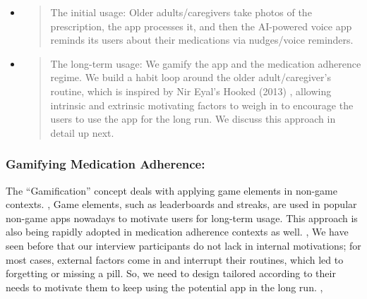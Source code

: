 \documentclass[acmlarge]{acmart}
\begin{document}
\begin{itemize}
\item
  \begin{quote}
  The initial usage: Older adults/caregivers take photos of the
  prescription, the app processes it, and then the AI-powered voice app
  reminds its users about their medications via nudges/voice reminders.
  \end{quote}
\item
  \begin{quote}
  The long-term usage: We gamify the app and the medication adherence
  regime. \cite{10.1145/2181037.2181040} We build a habit loop around the older
  adult/caregiver's routine, which is inspired by Nir Eyal's Hooked
  (2013) \cite{eyal2014hooked}, allowing intrinsic and extrinsic motivating factors
  to weigh in to encourage the users to use the app for the long run. We
  discuss this approach in detail up next.
  \end{quote}
\end{itemize}

\subsubsection{Gamifying Medication
Adherence: }
The ``Gamification'' concept deals with applying game elements in
non-game contexts. \cite{KRATH2021106963}, \cite{10.1145/1979742.1979575}Game elements, such as leaderboards and
streaks, are used in popular non-game apps nowadays to motivate users
for long-term usage. \cite{10.1145/3025453.3025826} This approach is also being rapidly
adopted in medication adherence contexts as well. \cite{Tran2022-zf}, \cite{Abdul_Rahim2017-hq} We have
seen before that our interview participants do not lack in internal
motivations; for most cases, external factors come in and interrupt
their routines, which led to forgetting or missing a pill. So, we need
to design tailored according to their needs to motivate them to keep
using the potential app in the long run. \cite{10.1145/3311350.3347167}, \cite{10.1145/3170427.3170662}
\end{document}
